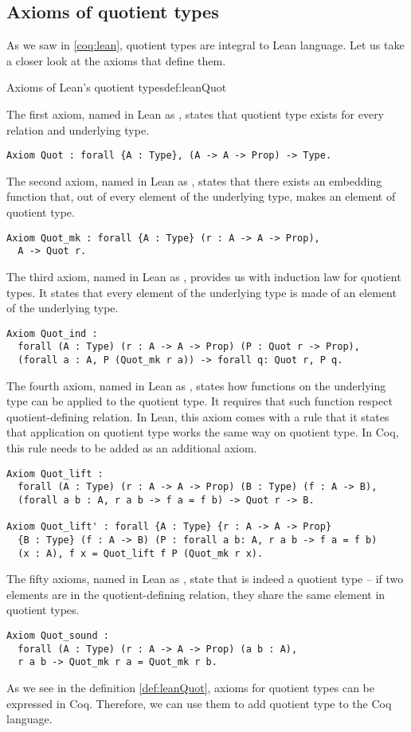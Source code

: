 \subsection{Axioms of quotient types}
As we saw in \ref{coq:lean}, quotient types are integral to Lean language. Let us take a closer look at the axioms that define them.
\begin{defi}{Axioms of Lean's quotient types}{def:leanQuot}

The first axiom, named in Lean as , states that quotient type exists for every relation and underlying type.
\begin{verbatim}
Axiom Quot : forall {A : Type}, (A -> A -> Prop) -> Type.
\end{verbatim}
The second axiom, named in Lean as , states that there exists an embedding function that, out of every element of the underlying type, makes an element of quotient type.
\begin{verbatim}
Axiom Quot_mk : forall {A : Type} (r : A -> A -> Prop),
  A -> Quot r.
\end{verbatim}
The third axiom, named in Lean as , provides us with induction law for quotient types. It states that every element of the underlying type is made of an element of the underlying type.
\begin{verbatim}
Axiom Quot_ind : 
  forall (A : Type) (r : A -> A -> Prop) (P : Quot r -> Prop),
  (forall a : A, P (Quot_mk r a)) -> forall q: Quot r, P q.
\end{verbatim}
The fourth axiom, named in Lean as , states how functions on the underlying type can be applied to the quotient type. It requires that such function respect quotient-defining relation. In Lean, this axiom comes with a rule that it states that application on quotient type works the same way on quotient type. In Coq, this rule needs to be added as an additional axiom.
\begin{verbatim}
Axiom Quot_lift :
  forall (A : Type) (r : A -> A -> Prop) (B : Type) (f : A -> B),
  (forall a b : A, r a b -> f a = f b) -> Quot r -> B.

Axiom Quot_lift' : forall {A : Type} {r : A -> A -> Prop} 
  {B : Type} (f : A -> B) (P : forall a b: A, r a b -> f a = f b) 
  (x : A), f x = Quot_lift f P (Quot_mk r x).
\end{verbatim}
The fifty axioms, named in Lean as , state that  is indeed a quotient type -- if two elements are in the quotient-defining relation, they share the same element in quotient types.
\begin{verbatim}
Axiom Quot_sound :
  forall (A : Type) (r : A -> A -> Prop) (a b : A),
  r a b -> Quot_mk r a = Quot_mk r b.
\end{verbatim}
\end{defi}
As we see in the definition \ref{def:leanQuot}, axioms for quotient types can be expressed in Coq. Therefore, we can use them to add quotient type to the Coq language.
